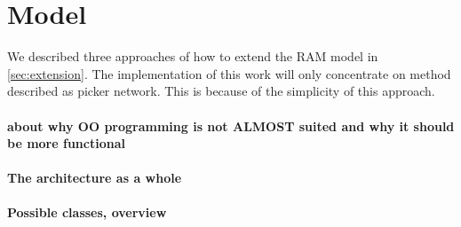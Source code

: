 
%
%


\section{Model}
\label{sec:design_model}

We described three approaches of how to extend the RAM model
in \autoref{sec:extension}. The implementation of this work
will only concentrate on method described as picker network.
This is because of the simplicity of this approach.


\paragraph{about why OO programming is not ALMOST suited and why it should be more functional}


\paragraph{The architecture as a whole}
\paragraph{Possible classes, overview}

